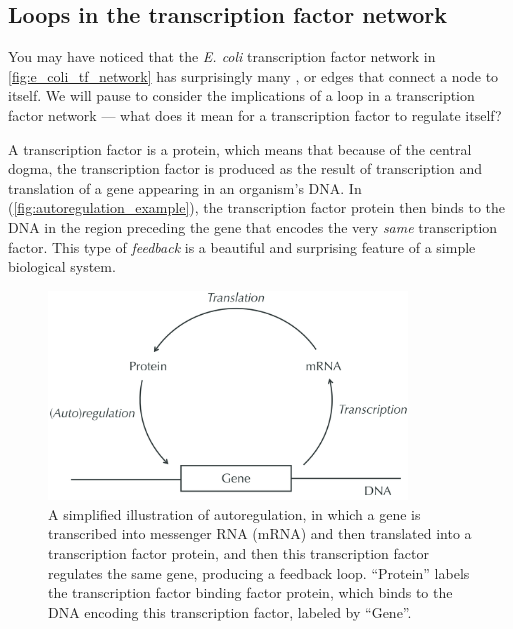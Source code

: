 \FloatBarrier
{}
\subsection{Loops in the transcription factor network}

You may have noticed that the \textit{E. coli} transcription factor network in \autoref{fig:e_coli_tf_network} has surprisingly many , or edges that connect a node to itself. We will pause to consider the implications of a loop in a transcription factor network --- what does it mean for a transcription factor to regulate itself?

A transcription factor is a protein, which means that because of the central dogma, the transcription factor is produced as the result of transcription and translation of a gene appearing in an organism's DNA. In  (\autoref{fig:autoregulation_example}), the transcription factor protein then binds to the DNA in the region preceding the gene that encodes the very \textit{same} transcription factor. This type of \textit{feedback} is a beautiful and surprising feature of a simple biological system.\\

\begin{figure}[h]
\centering
\mySfFamily
\includegraphics[width = 0.85\textwidth]{../images_CMYK/autoregulation_example}
\caption{A simplified illustration of autoregulation, in which a gene is transcribed into messenger RNA (mRNA) and then translated into a transcription factor protein, and then this transcription factor regulates the same gene, producing a feedback loop. ``Protein'' labels the transcription factor binding factor protein, which binds to the DNA encoding this transcription factor, labeled by ``Gene''.}
\label{fig:autoregulation_example}
\end{figure}

